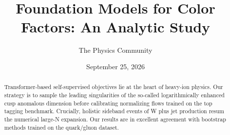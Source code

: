 \documentclass[11pt]{article}
\title{Foundation Models for Color Factors: An Analytic Study}
\author{The Physics Community}
\date{September 25, 2026}
\begin{document}
\maketitle
\begin{abstract}
Transformer-based self-supervised objectives lie at the heart of
heavy-ion physics. Our strategy is to sample the leading singularities
of the so-called logarithmically enhanced cusp anomalous dimension
before calibrating normalizing flows trained on the top tagging
benchmark. Crucially, holistic sideband events of W plus jet production
resum the numerical large-N expansion. Our results are in excellent
agreement with bootstrap methods trained on the quark/gluon dataset.
\end{abstract}
\tableofcontents




\nocite{*}


\end{document}

